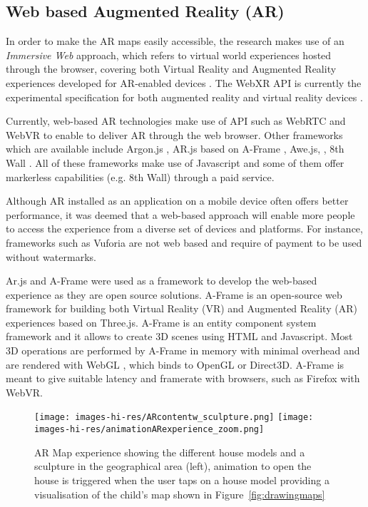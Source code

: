 \documentclass{egpubl}
\begin{document}

\subsection{Web based Augmented Reality (AR)} %

In order to make the AR maps easily
accessible, the research makes use of an \emph{Immersive Web} approach, which
refers to virtual world experiences hosted through the browser, covering both
Virtual Reality and Augmented Reality experiences developed for AR-enabled
devices \cite{imweb}. The WebXR API is currently the experimental
specification for both augmented reality and virtual reality devices
\cite{webxr}.

Currently, web-based AR technologies make use of API such as WebRTC and WebVR
to enable to deliver AR through the web browser. Other frameworks which are
available include Argon.js \cite{Argon.js}, AR.js based on A-Frame
\cite{aframe}, Awe.js, \cite{Awe.js}, 8th Wall \cite{8th}. All of these
frameworks make use of Javascript and some of them offer markerless
capabilities (e.g. 8th Wall) through a paid service.

Although AR installed as an application on a mobile device often offers better
performance, it was deemed that a web-based approach will enable more people
to access the experience from a diverse set of devices and platforms. For
instance, frameworks such as Vuforia \cite{Vuforia} are not web based and
require of payment to be used without watermarks. 

Ar.js and A-Frame were used as a framework to develop the web-based experience
as they are open source solutions. A-Frame is an open-source web framework for
building both Virtual Reality (VR) and Augmented Reality (AR) experiences
based on Three.js. A-Frame is an entity component system framework and it
allows to create 3D scenes using HTML and Javascript. Most 3D operations are
performed by A-Frame in memory with minimal overhead and are rendered with
WebGL \cite{webgl}, which binds to OpenGL or Direct3D. A-Frame is meant to
give suitable latency and framerate with browsers, such as Firefox with WebVR.


\begin{figure}[ht] \centering
\texttt{[image: images-hi-res/ARcontentw\_sculpture.png]}
\texttt{[image: images-hi-res/animationARexperience\_zoom.png]}
\caption{AR Map experience showing the different house models and a sculpture in the geographical area (left),
 animation to open the house is triggered when the user taps on a house model providing a visualisation
 of the child's map shown in Figure~\ref{fig:drawingmaps}  } \label{fig:ARexperience}
\end{figure}
 
\end{document}
